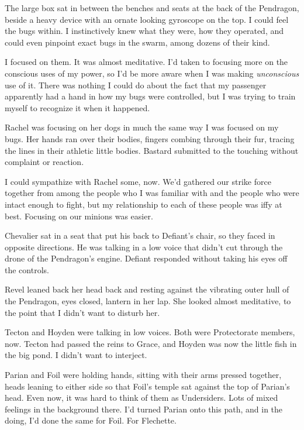 





The large box sat in between the benches and seats at the back of the Pendragon, beside a heavy device with an ornate looking gyroscope on the top.  I could feel the bugs within.  I instinctively knew what they were, how they operated, and could even pinpoint exact bugs in the swarm, among dozens of their kind.



I focused on them.  It was almost meditative.  I'd taken to focusing more on the conscious uses of my power, so I'd be more aware when I was making \emph{unconscious} use of it.  There was nothing I could do about the fact that my passenger apparently had a hand in how my bugs were controlled, but I was trying to train myself to recognize it when it happened.



Rachel was focusing on her dogs in much the same way I was focused on my bugs.  Her hands ran over their bodies, fingers combing through their fur, tracing the lines in their athletic little bodies.  Bastard submitted to the touching without complaint or reaction.



I could sympathize with Rachel some, now.  We'd gathered our strike force together from among the people who I was familiar with and the people who were intact enough to fight, but my relationship to each of these people was iffy at best.  Focusing on our minions was easier.



Chevalier sat in a seat that put his back to Defiant's chair, so they faced in opposite directions.  He was talking in a low voice that didn't cut through the drone of the Pendragon's engine.  Defiant responded without taking his eyes off the controls.



Revel leaned back her head back and resting against the vibrating outer hull of the Pendragon, eyes closed, lantern in her lap.  She looked almost meditative, to the point that I didn't want to disturb her.



Tecton and Hoyden were talking in low voices.  Both were Protectorate members, now.  Tecton had passed the reins to Grace, and Hoyden was now the little fish in the big pond.  I didn't want to interject.



Parian and Foil were holding hands, sitting with their arms pressed together, heads leaning to either side so that Foil's temple sat against the top of Parian's head.  Even now, it was hard to think of them as Undersiders.  Lots of mixed feelings in the background there.  I'd turned Parian onto this path, and in the doing, I'd done the same for Foil.  For Flechette.



